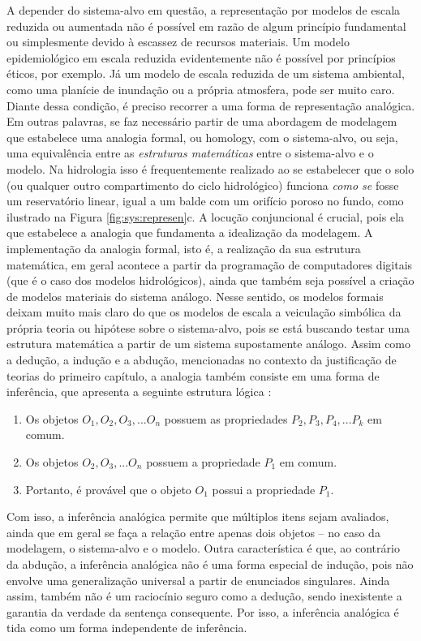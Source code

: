 \documentclass[./main.tex]{subfiles}
\begin{document}
\par A depender do sistema-alvo em questão, a representação por modelos de escala reduzida ou aumentada não é possível em razão de algum princípio fundamental ou simplesmente devido à escassez de recursos materiais. Um modelo epidemiológico em escala reduzida evidentemente não é possível por princípios éticos, por exemplo. Já um modelo de escala reduzida de um sistema ambiental, como uma planície de inundação ou a própria atmosfera, pode ser muito caro. Diante dessa condição, é preciso recorrer a uma forma de representação analógica. Em outras palavras, se faz necessário partir de uma abordagem de modelagem que estabelece uma analogia formal, ou \gls{homology}, com o sistema-alvo, ou seja, uma equivalência entre as \textit{estruturas matemáticas} entre o sistema-alvo e o modelo. Na hidrologia isso é frequentemente realizado ao se estabelecer que o solo (ou qualquer outro compartimento do ciclo hidrológico) funciona \textit{como se} fosse um reservatório linear, igual a um balde com um orifício poroso no fundo, como ilustrado na Figura \ref{fig:sys:represen}c. A locução conjuncional  é crucial, pois ela que estabelece a analogia que fundamenta a idealização da modelagem. A implementação da analogia formal, isto é, a realização da sua estrutura matemática, em geral acontece a partir da programação de computadores digitais (que é o caso dos modelos hidrológicos), ainda que também seja possível a criação de modelos materiais do sistema análogo. Nesse sentido, os modelos formais deixam muito mais claro do que os modelos de escala a veiculação simbólica da própria teoria ou hipótese sobre o sistema-alvo, pois se está buscando testar uma estrutura matemática a partir de um sistema supostamente análogo. Assim como a dedução, a indução e a abdução, mencionadas no contexto da justificação de teorias do primeiro capítulo, a analogia também consiste em uma forma de inferência, que apresenta a seguinte estrutura lógica \cite{shaw_ashley_1983}:
\begin{enumerate}
    \item Os objetos $O_1, O_2, O_3, ... O_n$ possuem as propriedades $P_2, P_3, P_4, ... P_k$ em comum. 
    \item Os objetos $O_2, O_3, ... O_n$ possuem a propriedade $P_1$ em comum. \\
    \item Portanto, é provável que o objeto $O_1$ possui a propriedade $P_1$.
\end{enumerate}
Com isso, a inferência analógica permite que múltiplos itens sejam avaliados, ainda que em geral se faça a relação entre apenas dois objetos – no caso da modelagem, o sistema-alvo e o modelo. Outra característica é que, ao contrário da abdução, a inferência analógica não é uma forma especial de indução, pois não envolve uma generalização universal a partir de enunciados singulares. Ainda assim, também não é um raciocínio seguro como a dedução, sendo inexistente a garantia da verdade da sentença consequente. Por isso, a inferência analógica é tida como um forma independente de inferência.
\end{document}
